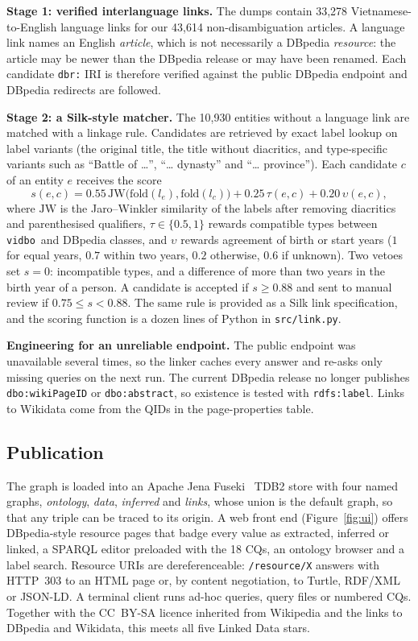 \documentclass{article}
\newcommand{\ttl}[1]{\texttt{#1}}          %
\newcommand{\vidbo}{\ttl{vidbo}}
\begin{document}
\textbf{Stage 1: verified interlanguage links.} The dumps contain 33{,}278 Vietnamese-to-English language links for
our 43{,}614 non-disambiguation articles. A language link names an English \emph{article}, which is not necessarily a
DBpedia \emph{resource}: the article may be newer than the DBpedia release or may have been renamed. Each candidate
\ttl{dbr:} IRI is therefore verified against the public DBpedia endpoint and DBpedia redirects are followed.

\textbf{Stage 2: a Silk-style matcher.} The 10{,}930 entities without a language link are matched with a linkage rule.
Candidates are retrieved by exact label lookup on label variants (the original title, the title without diacritics,
and type-specific variants such as ``Battle of \ldots'', ``\ldots{} dynasty'' and ``\ldots{} province''). Each
candidate $c$ of an entity $e$ receives the score
\begin{equation}
  s(e,c) = 0.55\, \mathrm{JW}\big(\mathrm{fold}(l_e), \mathrm{fold}(l_c)\big) + 0.25\, \tau(e,c) + 0.20\, \upsilon(e,c),
\end{equation}
where $\mathrm{JW}$ is the Jaro--Winkler similarity of the labels after removing diacritics and parenthesised
qualifiers, $\tau \in \{0.5, 1\}$ rewards compatible types between \vidbo\ and DBpedia classes, and $\upsilon$ rewards
agreement of birth or start years ($1$ for equal years, $0.7$ within two years, $0.2$ otherwise, $0.6$ if unknown).
Two vetoes set $s = 0$: incompatible types, and a difference of more than two years in the birth year of a person. A
candidate is accepted if $s \geq 0.88$ and sent to manual review if $0.75 \leq s < 0.88$. The same rule is provided as
a Silk link specification, and the scoring function is a dozen lines of Python in \ttl{src/link.py}.

\textbf{Engineering for an unreliable endpoint.} The public endpoint was unavailable several times, so the linker
caches every answer and re-asks only missing queries on the next run. The current DBpedia release no longer publishes
\ttl{dbo:wikiPageID} or \ttl{dbo:abstract}, so existence is tested with \ttl{rdfs:label}. Links to Wikidata come from
the QIDs in the page-properties table.

\subsection{Publication}\label{sec:pub}

The graph is loaded into an Apache Jena Fuseki~\cite{jena} TDB2 store with four named graphs, \emph{ontology},
\emph{data}, \emph{inferred} and \emph{links}, whose union is the default graph, so that any triple can be traced to its
origin. A web front end (Figure~\ref{fig:ui}) offers DBpedia-style resource pages that badge every value as extracted,
inferred or linked, a SPARQL editor preloaded with the 18 CQs, an ontology browser and a label search. Resource URIs
are dereferenceable: \ttl{/resource/X} answers with HTTP~303 to an HTML page or, by content negotiation, to Turtle,
RDF/XML or JSON-LD. A terminal client runs ad-hoc queries, query files or numbered CQs. Together with the CC~BY-SA
licence inherited from Wikipedia and the links to DBpedia and Wikidata, this meets all five Linked Data stars.
\end{document}
